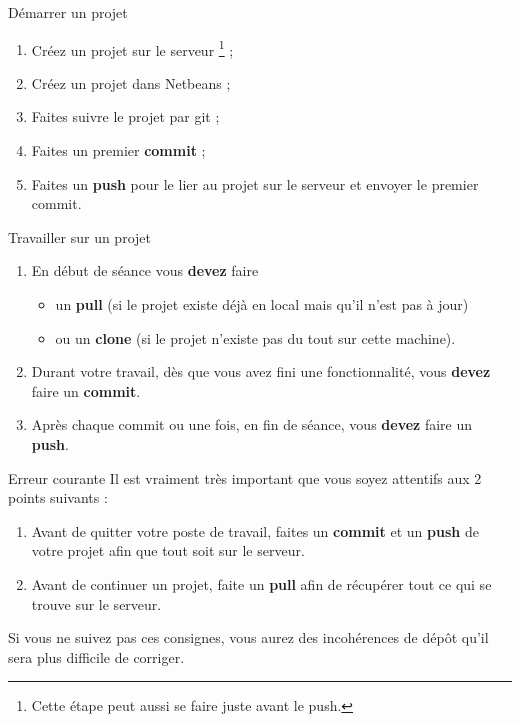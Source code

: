 \documentclass[a4paper,11pt]{style-esi/td}
\begin{document}
\begin{infoit}{Démarrer un projet}
\begin{enumerate}
	\item Créez un projet sur le serveur%
		\footnote{Cette étape peut aussi se faire juste avant le push.} ;
	\item Créez un projet dans Netbeans ;
	\item Faites suivre le projet par git ;
	\item Faites un premier \textbf{commit} ;
	\item Faites un \textbf{push} pour le lier au projet sur le serveur
		et envoyer le premier commit.
\end{enumerate}
\end{infoit}

\begin{infoit}{Travailler sur un projet}
\begin{enumerate}
	\item 
		En début de séance vous \textbf{devez} faire 
		\begin{itemize}
		\item
			un \textbf{pull} 
				(si le projet existe déjà en local mais qu'il n'est pas à jour)
		\item 
			ou un \textbf{clone} (si le projet n'existe pas du tout sur cette machine).
		\end{itemize}
	\item Durant votre travail,
		dès que vous avez fini une fonctionnalité,
		vous \textbf{devez} faire un \textbf{commit}.
	\item 
		Après chaque commit ou une fois, en fin de séance,
		vous \textbf{devez} faire un \textbf{push}.
\end{enumerate}
\end{infoit}

\begin{alertit}{Erreur courante}
	Il est vraiment très important que vous soyez attentifs aux 2 points suivants :
	\begin{enumerate}
	\item 
		Avant de quitter votre poste de travail,
		faites un \textbf{commit} et un \textbf{push} de votre projet 
		afin que tout soit sur le serveur.
	\item
		Avant de continuer un projet,
		faite un \textbf{pull} afin de récupérer tout ce qui se trouve sur le serveur.
	\end{enumerate}
	Si vous ne suivez pas ces consignes,
	vous aurez des incohérences de dépôt qu'il sera plus difficile de corriger.
\end{alertit}
\end{document}
